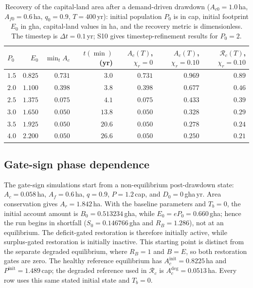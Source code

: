 \documentclass[11pt,a4paper]{article}
\begin{document}
\begin{table}[htbp]
\centering\small
\caption{Recovery of the capital-land area after a demand-driven drawdown ($A_{c0}=1.0$\,ha, $A_{f0}=0.6$\,ha, $q_0=0.9$, $T=400$\,yr): initial population $P_0$ is in cap, initial footprint $E_0$ in gha, capital-land values in ha, and the recovery metric is dimensionless. The timestep is $\Delta t=0.1$\,yr; S10 gives timestep-refinement results for $P_0=2$.}
\label{tab:si_recovery}
\begin{tabular}{l r r r r r r}
\toprule
$P_0$ & $E_0$ & $\min_tA_c$ & $t(\min)$ (yr) & $A_c(T)$, $\chi_r=0$ & $A_c(T)$, $\chi_r=0.10$ & $\mathcal R_c(T)$, $\chi_r=0.10$ \\
\midrule
$1.5$ & $0.825$ & $0.731$ & $3.0$ & $0.731$ & $0.969$ & $0.89$ \\
$2.0$ & $1.100$ & $0.398$ & $3.8$ & $0.398$ & $0.677$ & $0.46$ \\
$2.5$ & $1.375$ & $0.075$ & $4.1$ & $0.075$ & $0.433$ & $0.39$ \\
$3.0$ & $1.650$ & $0.050$ & $13.8$ & $0.050$ & $0.328$ & $0.29$ \\
$3.5$ & $1.925$ & $0.050$ & $20.6$ & $0.050$ & $0.278$ & $0.24$ \\
$4.0$ & $2.200$ & $0.050$ & $26.6$ & $0.050$ & $0.250$ & $0.21$ \\
\bottomrule
\end{tabular}
\end{table}

\subsection{Gate-sign phase dependence}\label{si:gates}

The gate-sign simulations start from a non-equilibrium post-drawdown state: $A_c=0.058$\,ha, $A_f=0.6$\,ha, $q=0.9$, $P=1.2$\,cap, and $D_0=0$\,gha\,yr. Area conservation gives $A_r=1.842$\,ha. With the baseline parameters and $T_b=0$, the initial account amount is $B_0=0.513234$\,gha, while $E_0=eP_0=0.660$\,gha; hence the run begins in shortfall ($S_0=0.146766$\,gha and $R_B=1.286$), not at an equilibrium. The deficit-gated restoration is therefore initially active, while surplus-gated restoration is initially inactive. This starting point is distinct from the separate degraded equilibrium, where $R_B=1$ and $B=E$, so both restoration gates are zero. The healthy reference equilibrium has $A_c^{\mathrm{init}}=0.8225$\,ha and $P^{\mathrm{init}}=1.489$\,cap; the degraded reference used in $\mathcal R_c$ is $A_c^{\mathrm{deg}}=0.0513$\,ha. Every row uses this same stated initial state and $T_b=0$.
\end{document}
